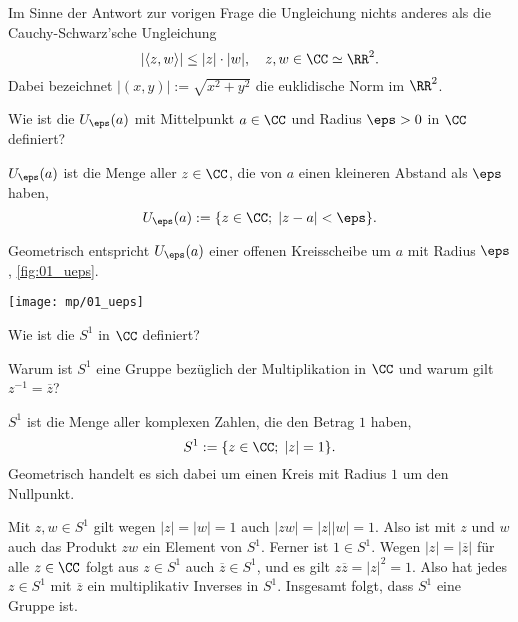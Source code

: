 \begin{antwort}
  Im Sinne der Antwort zur vorigen Frage  die 
  Ungleichung nichts anderes als die 
  Cauchy-Schwarz'sche Ungleichung                                                
  \[
  | \langle z,w \rangle | \le |z|\cdot|w|, \quad z,w \in\CC \simeq \RR^2.
  \]
  Dabei bezeichnet $|(x,y)|:=\sqrt{x^2+y^2}$ die euklidische Norm 
  im $\RR^2$.
  \AntEnd
  
\end{antwort}






\begin{frage}
  \label{01_ueps}
  Wie ist die  
  $U_\eps(a)$ mit Mittelpunkt $a\in\CC$ und Radius 
  $\eps > 0$ in $\CC$ definiert?
\end{frage}


\begin{antwort}[]
  \Ant $U_\eps (a)$ ist die Menge aller $z\in \CC$, die von $a$ einen 
  kleineren Abstand als $\eps$ haben,
  \begin{equation}
    U_\eps (a) := \{ z\in\CC; \; |z-a| < \eps \}. 
  \end{equation}

  Geometrisch entspricht $U_\eps(a)$ einer offenen Kreisscheibe um $a$ mit Radius $\eps$, 
  \sieheAbbildung\ref{fig:01_ueps}.

  \begin{center}
    \texttt{[image: mp/01\_ueps]}
    \label{fig:01_ueps}
  \end{center}
\end{antwort}



\begin{frage}
  Wie ist die  
  $S^1$ in $\CC$ definiert?

  Warum ist $S^1$ eine Gruppe bezüglich der Multiplikation in $\CC$ und warum 
  gilt $z^{-1}=\overline{z}$?
\end{frage}

\begin{antwort}
  $S^1$ ist die Menge aller komplexen Zahlen, die den Betrag $1$ haben,
  \[
  S^1 := \{ z\in\CC; \; |z|=1 \}.
  \]
  Geometrisch handelt es sich dabei um einen Kreis 
  mit Radius $1$ um den Nullpunkt.

  \medskip
  Mit $z,w\in S^1$ gilt wegen $|z|=|w|=1$ auch $|zw|=|z||w|=1$. 
  Also ist mit $z$ und $w$ auch das Produkt $zw$ ein Element von $S^1$. 
  Ferner ist $1\in S^1$. Wegen $|z|=|\overline z|$ für alle 
  $z\in \CC$ folgt aus $z\in S^1$ auch $\overline z \in S^1$, und 
  es gilt $z\overline z = |z|^2=1$. Also hat jedes $z\in S^1$ mit 
  $\overline z$ ein multiplikativ Inverses in $S^1$. Insgesamt folgt, 
  dass $S^1$ eine Gruppe ist.
  \AntEnd
\end{antwort}






